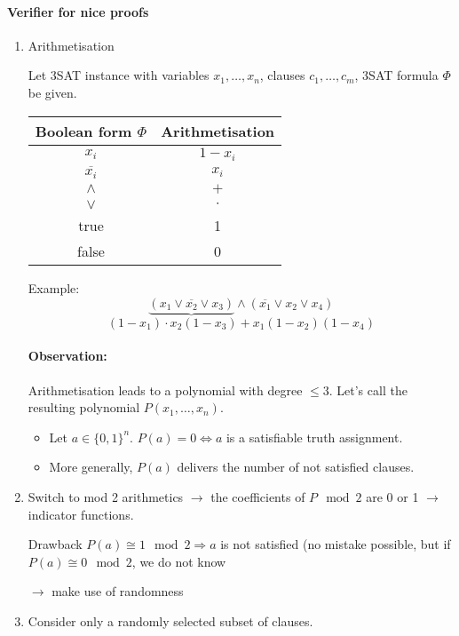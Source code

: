 \documentclass[11pt]{article}
\theoremstyle{definition}
\theoremstyle{definition}
\begin{document}
\paragraph{Verifier for nice proofs}
\begin{enumerate}
\item Arithmetisation
	
	Let 3SAT instance with variables $ x_1, \dots, x_n $, clauses $ c_1, \dots, c_m $, 3SAT formula $ \Phi$ be given.
	
	\begin{tabular}{c c}
	Boolean form $ \Phi $ & Arithmetisation \\
	\hline
	$ x_i $ & $ 1 - x_i $ \\
	$ \overline{x_i} $ & $ x_i $ \\
	$ \wedge $ & $ + $ \\
	$ \vee $ & $ \cdot $ \\
	true & 1 \\
	false & 0
	\end{tabular}
	
	Example:
	\[ \underbrace{(x_1 \vee \overline{x_2} \vee x_3)} \wedge (\overline{x_1} \vee x_2 \vee x_4) \]
	\[ (1-x_1) \cdot x_2 (1- x_3) + x_1 (1 - x_2) (1 - x_4) \]
	
	\paragraph{Observation:}
	Arithmetisation leads to a polynomial with degree $ \leq 3 $. Let's call the resulting polynomial $ P(x_1, \dots, x_n )$.
	
	\begin{itemize}
	\item Let $ a \in \{ 0, 1\}^n $. $ P(a) = 0 \Leftrightarrow a $ is a satisfiable truth assignment.
	\item More generally, $ P(a) $ delivers the number of not satisfied clauses.
	\end{itemize}
\item Switch to mod 2 arithmetics $ \rightarrow $ the coefficients of $ P \mod 2$ are 0 or 1 $ \rightarrow $ indicator functions.

	Drawback
	$ P(a) \cong 1 \mod 2 \Rightarrow a $ is not satisfied (no mistake possible, but if $ P(a) \cong 0 \mod 2 $, we do not know
	
	$ \rightarrow $ make use of randomness
	
\item Consider only a randomly selected subset of clauses.
	

\end{enumerate}
\end{document}
